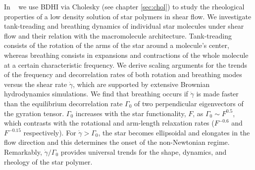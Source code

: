 \documentclass[ twoside,openright,titlepage,numbers=noenddot,%
headinclude,footinclude,cleardoublepage=empty,abstract=on,
BCOR=5mm,paper=b5,fontsize=11pt, dvipsnames
]{scrreprt}
\begin{document}
In ~\cite{Pelaez2020} we use \gls{BDHI} via Cholesky (see chapter \ref{sec:chol}) to study the rheological properties of a low density solution of star polymers in shear flow.
We investigate tank-treading and breathing dynamics of individual star molecules under shear flow and their relation with the macromolecule architecture. Tank-treading consists of the rotation of the arms of the star around a molecule’s center, whereas breathing consists in expansions and contractions of the whole molecule at a certain characteristic frequency. We derive scaling arguments for the trends of the frequency and decorrelation rates of both rotation and breathing modes versus the shear rate $\dot{\gamma}$, which are supported by extensive Brownian hydrodynamics simulations. We find that breathing occurs if $\dot{\gamma}$ is made faster than the equilibrium decorrelation rate $\Gamma_0$ of two perpendicular eigenvectors of the gyration tensor. $\Gamma_0$ increases with the star functionality, $F$, as $\Gamma_0 \sim F^{0.5}$, which contrasts with the rotational and arm-length relaxation rates ($F^{-0.6}$ and $F^ {-0.15}$ respectively). For $\dot{\gamma} > \Gamma_0$, the star becomes ellipsoidal and elongates in the flow direction and this determines the onset of the non-Newtonian regime. Remarkably, $\dot{\gamma}/\Gamma_0$ provides universal trends for the shape, dynamics, and rheology of the star polymer.
%
%
\end{document}
